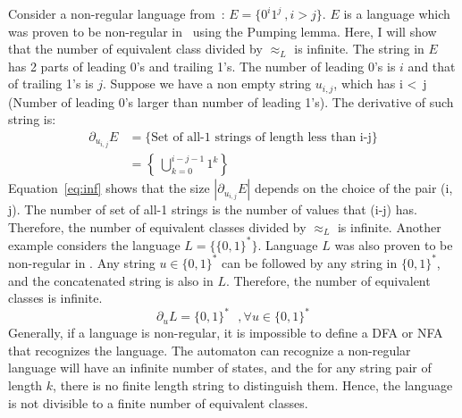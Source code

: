 \documentclass[a4paper,12pt]{article}
\begin{document}
Consider a non-regular language from~\cite{sip}: $E=\{0^{i}1^{j}\ , i > j\}$. $E$ is a language which was proven to be non-regular in~\cite{sip} using the Pumping lemma. Here, I will show that the number of equivalent class divided by $\approx_{L}$ is infinite. The string in $E$ has 2 parts of leading 0's and trailing 1's. The number of leading 0's is $i$ and that of trailing 1's is $j$. Suppose we have a non empty string $u_{i,j}$, which has i \textless\ j (Number of leading 0's larger than
number of leading 1's). The derivative of such string is:
\begin{equation} \label{eq:inf}
    \begin{aligned}
        \partial_{u_{i,j}}E & = \{\mbox{Set of all-1 strings of length less than i-j}\} \\
        & = \left \{ \ \bigcup\limits_{k=0}^{i-j-1}1^{k} \right \}
    \end{aligned}
\end{equation}
\noindent
Equation~\eqref{eq:inf} shows that the size $|\partial_{u_{i,j}}E|$ depends on the choice of the pair (i, j). The number of set of all-1 strings is the number of values that (i-j) has. Therefore, the number of equivalent classes divided by $\approx_{L}$ is infinite. Another example considers the language $L = \{ \{0,1\}^{*} \}$. Language $L$ was also proven to be non-regular in \cite{sip}. Any string $u \in \{0,1\}^{*}$ can be followed by any string in $\{0,1\}^{*}$, and the
concatenated string is also in $L$. Therefore, the number of equivalent classes is infinite.
\begin{equation}
    \partial_{u}L = \{0,1\}^{*} \mbox{ }, \forall u \in \{0,1\}^{*}
\end{equation}
Generally, if a language is non-regular, it is impossible to define a DFA or NFA that recognizes the language. The automaton can recognize a non-regular language will have an infinite number of states, and the for any string pair of length $k$, there is no finite length string to distinguish them. Hence, the language is not divisible to a finite number of equivalent classes.
\end{document}
